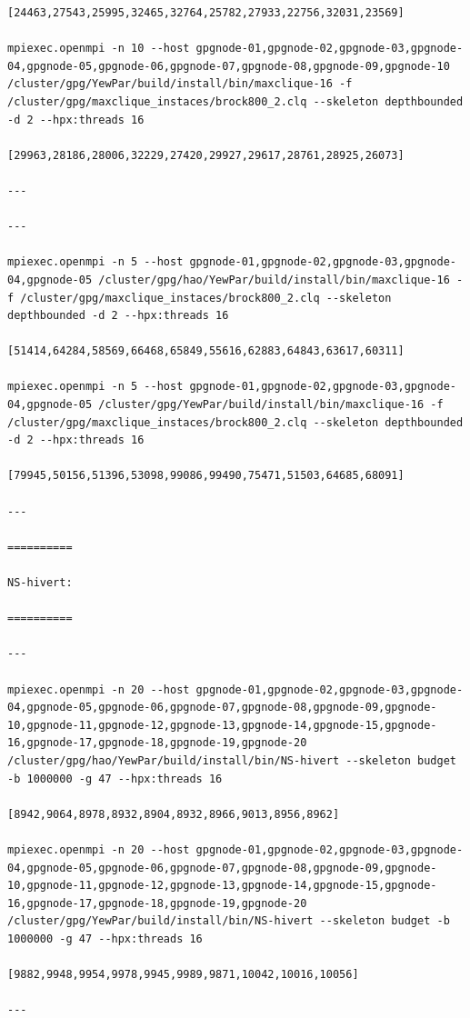 \documentclass{mproj}
\begin{document}
\begin{lstlisting}
[24463,27543,25995,32465,32764,25782,27933,22756,32031,23569]

mpiexec.openmpi -n 10 --host gpgnode-01,gpgnode-02,gpgnode-03,gpgnode-04,gpgnode-05,gpgnode-06,gpgnode-07,gpgnode-08,gpgnode-09,gpgnode-10 /cluster/gpg/YewPar/build/install/bin/maxclique-16 -f /cluster/gpg/maxclique_instaces/brock800_2.clq --skeleton depthbounded -d 2 --hpx:threads 16

[29963,28186,28006,32229,27420,29927,29617,28761,28925,26073]

---

---

mpiexec.openmpi -n 5 --host gpgnode-01,gpgnode-02,gpgnode-03,gpgnode-04,gpgnode-05 /cluster/gpg/hao/YewPar/build/install/bin/maxclique-16 -f /cluster/gpg/maxclique_instaces/brock800_2.clq --skeleton depthbounded -d 2 --hpx:threads 16

[51414,64284,58569,66468,65849,55616,62883,64843,63617,60311]

mpiexec.openmpi -n 5 --host gpgnode-01,gpgnode-02,gpgnode-03,gpgnode-04,gpgnode-05 /cluster/gpg/YewPar/build/install/bin/maxclique-16 -f /cluster/gpg/maxclique_instaces/brock800_2.clq --skeleton depthbounded -d 2 --hpx:threads 16

[79945,50156,51396,53098,99086,99490,75471,51503,64685,68091]

---

==========

NS-hivert:

==========

---

mpiexec.openmpi -n 20 --host gpgnode-01,gpgnode-02,gpgnode-03,gpgnode-04,gpgnode-05,gpgnode-06,gpgnode-07,gpgnode-08,gpgnode-09,gpgnode-10,gpgnode-11,gpgnode-12,gpgnode-13,gpgnode-14,gpgnode-15,gpgnode-16,gpgnode-17,gpgnode-18,gpgnode-19,gpgnode-20 /cluster/gpg/hao/YewPar/build/install/bin/NS-hivert --skeleton budget -b 1000000 -g 47 --hpx:threads 16

[8942,9064,8978,8932,8904,8932,8966,9013,8956,8962]

mpiexec.openmpi -n 20 --host gpgnode-01,gpgnode-02,gpgnode-03,gpgnode-04,gpgnode-05,gpgnode-06,gpgnode-07,gpgnode-08,gpgnode-09,gpgnode-10,gpgnode-11,gpgnode-12,gpgnode-13,gpgnode-14,gpgnode-15,gpgnode-16,gpgnode-17,gpgnode-18,gpgnode-19,gpgnode-20 /cluster/gpg/YewPar/build/install/bin/NS-hivert --skeleton budget -b 1000000 -g 47 --hpx:threads 16

[9882,9948,9954,9978,9945,9989,9871,10042,10016,10056]

---


\end{lstlisting}
\end{document}
